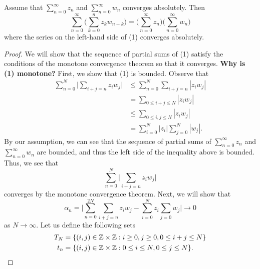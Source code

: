 \documentclass[a4paper]{report}
\begin{document}
\begin{theorem}
    Assume that \( \sum_{ n = 0  }^{  \infty  } {z}_{n} \) and \( \sum_{ n=0  }^{  \infty  } {w}_{n}  \) converges absolutely. Then 
    \[  \sum_{ n=0 }^{ \infty  } \Big(  \sum_{ k=0  }^{ n } {z}_{k } {w}_{n-k} \Big) = \Big(  \sum_{  n = 0  }^{ \infty  } {z}_{n} \Big) \Big(  \sum_{ n= 0  }^{ \infty  } {w}_{n} \Big) \tag{1} \]
where the series on the left-hand side of (1) converges absolutely.
\end{theorem}
\begin{proof}
We will show that the sequence of partial sums of (1) satisfy the conditions of the monotone convergence theorem so that it converges. \textbf{Why is (1) monotone?} First, we show that (1) is bounded. Observe that
\begin{align*}
    \sum_{ n = 0    }^{ N  }  \Big|  \sum_{ i + j = n  }^{  } {z}_{i} {w}_{j} \Big|  &\leq \sum_{ n = 0  }^{ N  } \sum_{ i + j = n  }^{   } | {z}_{i} {w}_{j} |  \\
                                                                                     &= \sum_{ 0 \leq i + j \leq N   }^{  }| {z}_{i} {w}_{j} | \\ 
                                                                                     &\leq \sum_{ 0 \leq i, j \leq N  }^{  } | {z}_{i} {w}_{j} | \\
                                                                                     &= \sum_{i = 0  }^{ N  } | {z}_{i}  |  \sum_{ j=0  }^{ N  } | {w}_{j} |. 
\end{align*}
By our assumption, we can see that the sequence of partial sums of \( \sum_{ n= 0  }^{  \infty  } {z}_{n}    \) and \( \sum_{ n = 0  }^{  \infty  } {w}_{n} \) are bounded, and thus the left side of the inequality above is bounded. Thus, we see that 
\[  \sum_{ n = 0  }^{  N  } \Big|  \sum_{  i + j = n  }^{   } {z}_{i} {w}_{j} \Big|  \] 
converges by the monotone convergence theorem. Next, we will show that 
\[  {\alpha}_{n} = \Big|  \sum_{ n = 0  }^{ 2N  } \sum_{  i + j = n  } {z}_{i} {w}_{j} - \sum_{ i = 0  }^{ N  } {z}_{i} \sum_{ j = 0  } {w}_{j}  \Big| \to 0  \]
as \( N \to \infty  \). Let us define the following sets
\begin{align*}
    {T}_{N} &= \{ (i,j) \in \mathbb{Z} \times \mathbb{Z} : i \geq 0 , j \geq 0, 0 \leq i + j \leq N  \}  \\
    {t}_{n} &= \{ (i,j) \in \mathbb{Z} \times \mathbb{Z} : 0 \leq i \leq N , 0 \leq j \leq N  \}.
\end{align*}

\end{proof}
\end{document}
